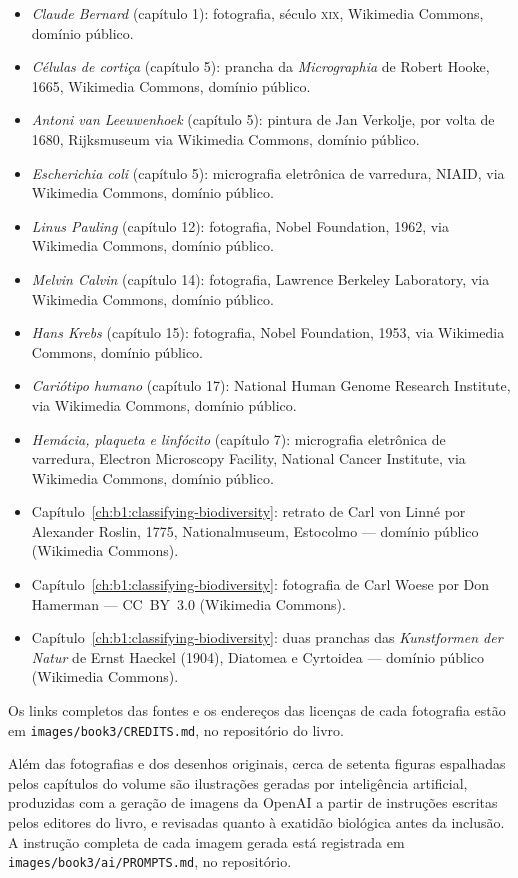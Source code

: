 \begin{itemize}
  \item \emph{Claude Bernard} (capítulo 1): fotografia, século
        \textsc{xix}, Wikimedia Commons, domínio público.
  \item \emph{Células de cortiça} (capítulo 5): prancha da
        \emph{Micrographia} de Robert Hooke, 1665, Wikimedia Commons,
        domínio público.
  \item \emph{Antoni van Leeuwenhoek} (capítulo 5): pintura de Jan
        Verkolje, por volta de 1680, Rijksmuseum via Wikimedia
        Commons, domínio público.
  \item \emph{Escherichia coli} (capítulo 5): micrografia eletrônica
        de varredura, NIAID, via Wikimedia Commons, domínio público.
  \item \emph{Linus Pauling} (capítulo 12): fotografia, Nobel
        Foundation, 1962, via Wikimedia Commons, domínio público.
  \item \emph{Melvin Calvin} (capítulo 14): fotografia, Lawrence
        Berkeley Laboratory, via Wikimedia Commons, domínio público.
  \item \emph{Hans Krebs} (capítulo 15): fotografia, Nobel Foundation,
        1953, via Wikimedia Commons, domínio público.
  \item \emph{Cariótipo humano} (capítulo 17): National Human Genome
        Research Institute, via Wikimedia Commons, domínio público.
  \item \emph{Hemácia, plaqueta e linfócito} (capítulo 7): micrografia
        eletrônica de varredura, Electron Microscopy Facility,
        National Cancer Institute, via Wikimedia Commons, domínio
        público.
  \item Capítulo~\ref{ch:b1:classifying-biodiversity}: retrato de Carl von Linné por Alexander Roslin, 1775, Nationalmuseum, Estocolmo --- domínio público (Wikimedia Commons).
  \item Capítulo~\ref{ch:b1:classifying-biodiversity}: fotografia de Carl Woese por Don Hamerman --- CC~BY~3.0 (Wikimedia Commons).
  \item Capítulo~\ref{ch:b1:classifying-biodiversity}: duas pranchas das \emph{Kunstformen der Natur} de Ernst Haeckel (1904), Diatomea e Cyrtoidea --- domínio público (Wikimedia Commons).
\end{itemize}

Os links completos das fontes e os endereços das licenças de cada
fotografia estão em \texttt{images/\allowbreak book3/\allowbreak CREDITS.md},
no repositório do livro.

\bigskip
Além das fotografias e dos desenhos originais, cerca de setenta
figuras espalhadas pelos capítulos do volume são ilustrações geradas
por inteligência artificial, produzidas com a geração de imagens da
OpenAI a partir de instruções escritas pelos editores do livro, e
revisadas quanto à exatidão biológica antes da inclusão. A instrução
completa de cada imagem gerada está registrada em
\texttt{images/\allowbreak book3/\allowbreak ai/\allowbreak PROMPTS.md}, no repositório.
\par\endgroup
\clearpage
